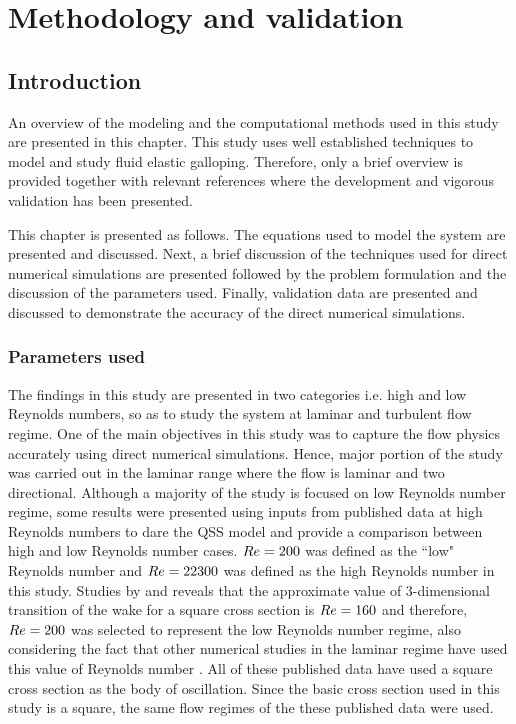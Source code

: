 
\chapter{Methodology and validation}

\section{Introduction}
 
An overview of the modeling and the computational methods used in this study are presented in this chapter. This study uses well established techniques to model and study fluid elastic galloping. Therefore, only a brief overview is provided together with relevant references where the development and vigorous validation has been presented.  

This chapter is presented as follows. The equations used to model the system are presented and discussed. Next, a brief discussion of the techniques used for direct numerical simulations are presented followed by the problem formulation and the discussion of the parameters used. Finally, validation data are presented and discussed to demonstrate the accuracy of the direct numerical simulations.


\subsection{Parameters used}

The findings in this study are presented in two categories i.e. high and low Reynolds numbers, so as to study the system at laminar and turbulent flow regime. One of the main objectives in this study was to capture the flow physics accurately using direct numerical simulations. Hence, major portion of the study was carried out in the laminar range where the flow is laminar and two directional. Although a majority of the study is focused on low Reynolds number regime, some results were presented using inputs from published data at high Reynolds numbers to dare the QSS model and provide a comparison between high and low Reynolds number cases. $Re=200$ was defined as the ``low" Reynolds number and $Re=22300$ was defined as the high Reynolds number in this study. Studies by \citet{tong2008} and \citet{sheard2009} reveals that the approximate value of 3-dimensional transition of the wake for a square cross section is $Re=160$ and therefore, $Re=200$ was selected to represent the low Reynolds number regime, also considering the fact that other numerical studies in the laminar regime have used this value of Reynolds number \citep{Robertson2003,Joly2012}. All of these published data have used a square cross section as the body of oscillation. Since the basic cross section used in this study is a square, the same flow regimes of the these published data were used.

